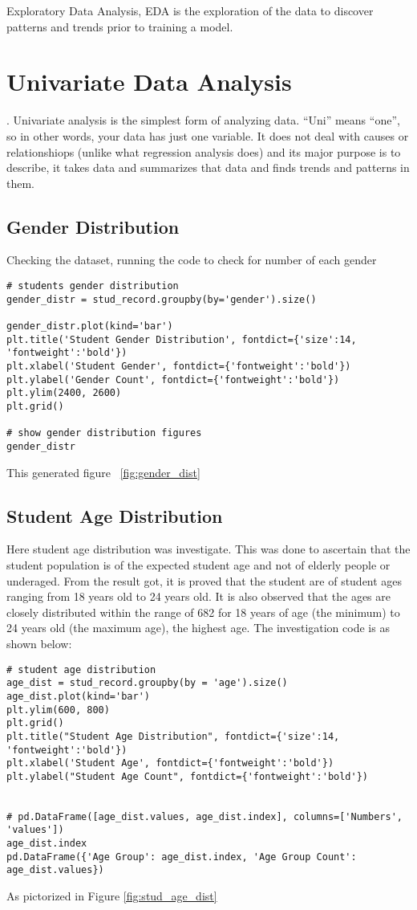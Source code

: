 Exploratory Data Analysis, EDA is the exploration of the data to discover patterns and trends prior to training a model. 

\section{Univariate Data Analysis}. Univariate analysis is the simplest form of analyzing data. “Uni” means “one”, so in other words, your data has just one variable. It does not deal with causes or relationshiops (unlike what regression analysis does) and its major purpose is to describe, it takes data and summarizes that data and finds trends and patterns in them.

\subsection{Gender Distribution}
Checking the dataset, running the code to check for number of each gender
\begin{verbatim}
# students gender distribution
gender_distr = stud_record.groupby(by='gender').size()

gender_distr.plot(kind='bar')
plt.title('Student Gender Distribution', fontdict={'size':14, 'fontweight':'bold'})
plt.xlabel('Student Gender', fontdict={'fontweight':'bold'})
plt.ylabel('Gender Count', fontdict={'fontweight':'bold'})
plt.ylim(2400, 2600)
plt.grid()

# show gender distribution figures
gender_distr
\end{verbatim}
This generated figure ~\ref{fig:gender_dist}


\subsection{Student Age Distribution}
Here student age distribution was investigate. This was done to ascertain that the student population is of the expected student age and not of elderly people or underaged. From the result got, it is proved that the student are of student ages ranging from 18 years old to 24 years old. It is also observed that the ages are closely distributed within the range of 682 for 18 years of age (the minimum) to  24 years old (the maximum age), the highest age.
The investigation code is as shown below: 
\begin{verbatim}
# student age distribution
age_dist = stud_record.groupby(by = 'age').size()
age_dist.plot(kind='bar')
plt.ylim(600, 800)
plt.grid()
plt.title("Student Age Distribution", fontdict={'size':14, 'fontweight':'bold'})
plt.xlabel('Student Age', fontdict={'fontweight':'bold'})
plt.ylabel("Student Age Count", fontdict={'fontweight':'bold'})


# pd.DataFrame([age_dist.values, age_dist.index], columns=['Numbers', 'values'])
age_dist.index
pd.DataFrame({'Age Group': age_dist.index, 'Age Group Count': age_dist.values})
\end{verbatim}
As pictorized in Figure \ref{fig:stud_age_dist}


